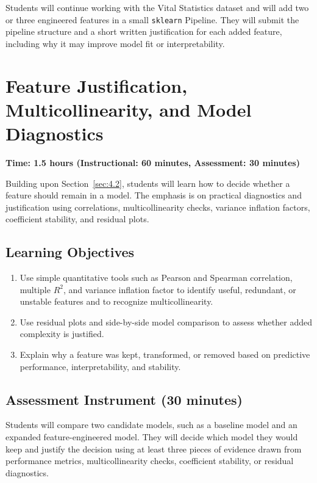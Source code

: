 Students will continue working with the Vital Statistics dataset and will add two or three engineered features in a small \verb|sklearn| Pipeline. They will submit the pipeline structure and a short written justification for each added feature, including why it may improve model fit or interpretability.

\section{Feature Justification, Multicollinearity, and Model Diagnostics}
\label{sec:4.3}

\textbf{Time: 1.5 hours (Instructional: 60 minutes, Assessment: 30 minutes)}

\noindent Building upon Section~\ref{sec:4.2}, students will learn how to decide whether a feature should remain in a model. The emphasis is on practical diagnostics and justification using correlations, multicollinearity checks, variance inflation factors, coefficient stability, and residual plots.

\subsection{Learning Objectives}

\begin{enumerate}
    \item Use simple quantitative tools such as Pearson and Spearman correlation, multiple $R^2$, and variance inflation factor to identify useful, redundant, or unstable features and to recognize multicollinearity.
    \item Use residual plots and side-by-side model comparison to assess whether added complexity is justified.
    \item Explain why a feature was kept, transformed, or removed based on predictive performance, interpretability, and stability.
\end{enumerate}

\subsection{Assessment Instrument (30 minutes)}

Students will compare two candidate models, such as a baseline model and an expanded feature-engineered model. They will decide which model they would keep and justify the decision using at least three pieces of evidence drawn from performance metrics, multicollinearity checks, coefficient stability, or residual diagnostics.

